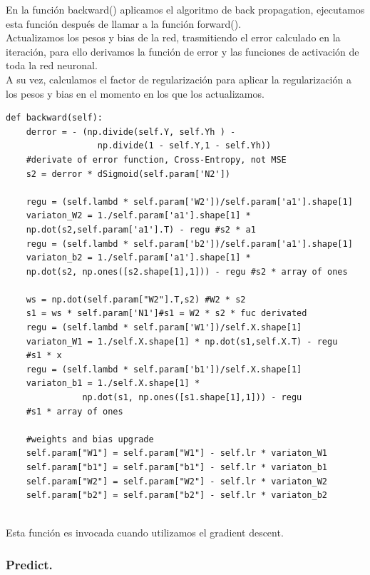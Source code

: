 \documentclass[a4paper,10pt]{article}
\begin{document}
En la función backward() aplicamos el algoritmo de back propagation, ejecutamos esta función después de llamar a la función forward(). \\Actualizamos los pesos y bias de la red, trasmitiendo el error calculado en la iteración, para ello derivamos la función de error y las funciones de activación de toda la red neuronal. \\A su vez, calculamos el factor de regularización para aplicar la regularización a los pesos y bias en el momento en los que los actualizamos.
\begin{lstlisting}
def backward(self):
    derror = - (np.divide(self.Y, self.Yh ) - 
                  np.divide(1 - self.Y,1 - self.Yh))
    #derivate of error function, Cross-Entropy, not MSE
    s2 = derror * dSigmoid(self.param['N2']) 

    regu = (self.lambd * self.param['W2'])/self.param['a1'].shape[1]
    variaton_W2 = 1./self.param['a1'].shape[1] *
    np.dot(s2,self.param['a1'].T) - regu #s2 * a1
    regu = (self.lambd * self.param['b2'])/self.param['a1'].shape[1]
    variaton_b2 = 1./self.param['a1'].shape[1] * 
    np.dot(s2, np.ones([s2.shape[1],1])) - regu #s2 * array of ones

    ws = np.dot(self.param["W2"].T,s2) #W2 * s2                    
    s1 = ws * self.param['N1']#s1 = W2 * s2 * fuc derivated      
    regu = (self.lambd * self.param['W1'])/self.X.shape[1]
    variaton_W1 = 1./self.X.shape[1] * np.dot(s1,self.X.T) - regu
    #s1 * x
    regu = (self.lambd * self.param['b1'])/self.X.shape[1]
    variaton_b1 = 1./self.X.shape[1] * 
               np.dot(s1, np.ones([s1.shape[1],1])) - regu 
    #s1 * array of ones 
    
    #weights and bias upgrade
    self.param["W1"] = self.param["W1"] - self.lr * variaton_W1 
    self.param["b1"] = self.param["b1"] - self.lr * variaton_b1 
    self.param["W2"] = self.param["W2"] - self.lr * variaton_W2 
    self.param["b2"] = self.param["b2"] - self.lr * variaton_b2
        
\end{lstlisting}
Esta función es invocada cuando utilizamos el gradient descent.
\subsubsection{Predict.}
\end{document}
